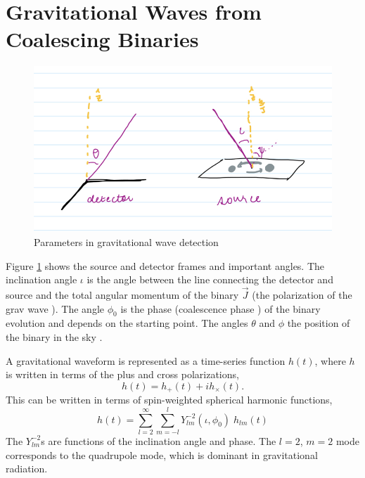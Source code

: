 \documentclass{article}
\newcommand{\red}[1]{{\color{red}{#1}\xspace}}
\begin{document}
\section{Gravitational Waves from Coalescing Binaries}
\begin{figure}[h]
    \centering
    \includegraphics[scale=0.2]{params.jpeg}
    \caption{Parameters in gravitational wave detection}
    \label{fig:GWFrameParams}
\end{figure}

Figure \ref{fig:GWFrameParams} shows the
source and detector frames and important angles.  The inclination
angle $\iota$ is the angle between the line connecting the detector
and source and the total angular momentum of the binary $\vec{J}$
(the polarization of the grav wave \red{I don't think this is the
polarization angle. Take a look at Figs 7 and 8 in Ch2 of Duncan Brown's
thesis}).  The angle $\phi_0$ is the
phase (coalescence phase \red{I don't think this is the coalescence phase.
It's just the phase angle in the frame of the binary. The subscript 0 is
an unfortunate choice of notation. I think a c is used for coalescence.}
) of the binary evolution and depends on the
starting point.  The angles $\theta$ and $\phi$ \red{\sout{are} give}
the position of the binary in the sky \red{in the frame of the detector}.
\red{Explain the angle $\psi$ e.g. as the 3rd Euler angle relating the
binary frame to the detector frame. Maybe you should download the source
for Brown's thesis from ArXiV and reproduce a couple of his figures?}

A gravitational waveform is represented
as a time-series function $h(t)$, where $h$ is written in terms of
the plus and cross polarizations,
\begin{equation}
    h(t) = h_{+}(t) + ih_{\times}(t). \label{ComplexTimeSeries}
\end{equation}
This can be written in terms of spin-weighted spherical harmonic functions,
\begin{equation}
    h(t) = \sum_{l=2}^{\infty} \sum_{m=-l}^{l} Y^{-2}_{lm}(\iota, \phi_0) \; h_{lm}(t) \label{SpinWheighted}
\end{equation}
The $Y^{-2}_{lm}$s are functions of the inclination angle and phase.
\red{Is this right? I thought $h(t)$ was written in terms of $\theta$ and
$\phi$ in the detector frame.}
The $l=2$, $m=2$ mode corresponds to the quadrupole mode,
which is dominant in gravitational radiation.
\end{document}

